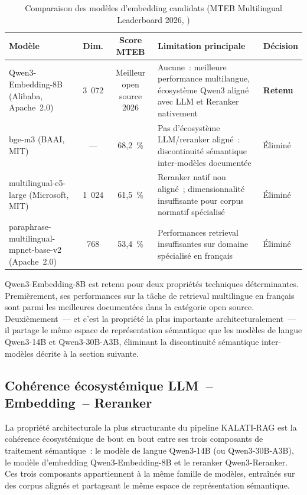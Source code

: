 \documentclass[12pt,a4paper]{report}
\begin{document}
\begin{table}
\centering
\caption{Comparaison des modèles d'embedding candidats (MTEB Multilingual Leaderboard 2026,
\autocite{Muennighoff2023})}
\label{tab:embedding-benchmark}
\renewcommand{\arraystretch}{1.4}
\begin{tabularx}{\textheight}{@{} l c c X l @{}}
\toprule
\textbf{Modèle} & \textbf{Dim.} & \textbf{Score MTEB} & \textbf{Limitation principale}
& \textbf{Décision} \\
\midrule
Qwen3-Embedding-8B \newline (Alibaba, Apache~2.0) & 3~072 & Meilleur open source 2026 &
Aucune~: meilleure performance multilangue, écosystème Qwen3 aligné avec LLM et Reranker nativement &
\textbf{Retenu} \\
\addlinespace
bge-m3 (BAAI, MIT) & --- & 68,2~\% &
Pas d'écosystème LLM/reranker aligné~: discontinuité sémantique inter-modèles documentée &
Éliminé \\
\addlinespace
multilingual-e5-large \newline (Microsoft, MIT) & 1~024 & 61,5~\% &
Reranker natif non aligné~; dimensionnalité insuffisante pour corpus normatif spécialisé &
Éliminé \\
\addlinespace
paraphrase-multilingual-mpnet-base-v2 \newline (Apache~2.0) & 768 & 53,4~\% &
Performances retrieval insuffisantes sur domaine spécialisé en français &
Éliminé \\
\bottomrule
\end{tabularx}
\end{table}

Qwen3-Embedding-8B est retenu pour deux propriétés techniques déterminantes. Premièrement,
ses performances sur la tâche de retrieval multilingue en français sont parmi les meilleures
documentées dans la catégorie open source. Deuxièmement~--- et c'est la propriété la plus
importante architecturalement~--- il partage le même espace de représentation sémantique que
les modèles de langue Qwen3-14B et Qwen3-30B-A3B, éliminant la discontinuité sémantique
inter-modèles décrite à la section suivante.

\subsection{Cohérence écosystémique LLM~-- Embedding~-- Reranker}
\label{sec:cohesion}

La propriété architecturale la plus structurante du pipeline KALATI-RAG est la cohérence
écosystémique de bout en bout entre ses trois composants de traitement sémantique~: le modèle
de langue Qwen3-14B (ou Qwen3-30B-A3B), le modèle d'embedding Qwen3-Embedding-8B et le
reranker Qwen3-Reranker. Ces trois composants appartiennent à la même famille de modèles,
entraînés sur des corpus alignés et partageant le même espace de représentation sémantique.
\end{document}
